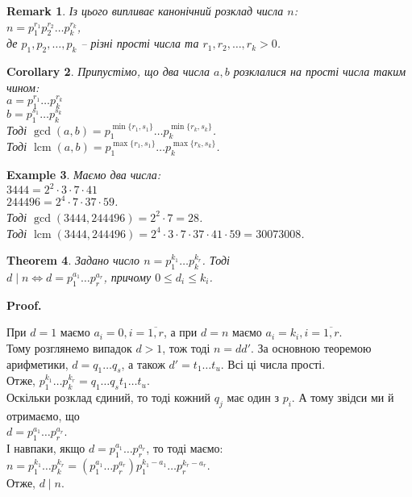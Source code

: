 \documentclass[a4paper, 14pt]{extarticle}
\makeatletter
\theoremstyle{theoremdd}
\newtheorem{theorem}{Theorem}[subsection]
\theoremstyle{theoremdd}
\theoremstyle{theoremdd}
\theoremstyle{theoremdd}
\newtheorem{example}[theorem]{Example}
\theoremstyle{theoremdd}
\theoremstyle{theoremdd}
\newtheorem{remark}[theorem]{Remark}
\theoremstyle{theoremdd}
\theoremstyle{theoremdd}
\newtheorem{corollary}[theorem]{Corollary}
\def\qed{$\blacksquare$}
\renewenvironment{proof}[1][Proof.\\]{\par
\pushQED{\hfill \qed}%
\normalfont \topsep6\p@\@plus6\p@\relax
\trivlist
\item\relax
{\bfseries
#1\@addpunct{.}}\hspace\labelsep\ignorespaces
}{%
\popQED\endtrivlist\@endpefalse
}
\DeclareMathOperator{\lcm}{lcm}
\makeatother
\begin{document}
\begin{remark}
Із цього випливає канонічний розклад числа $n$:\\
$n = p_1^{r_1} p_2^{r_2} \dots p_k^{r_k}$,\\
де $p_1, p_2, \dots, p_k$ -- різні прості числа та $r_1,r_2,\dots,r_k > 0$.
\end{remark}

\begin{corollary}
Припустімо, що два числа $a,b$ розклалися на прості числа таким чином:\\
$a = p_1^{r_1} \dots p_k^{r_k}$\\
$b = p_1^{s_1} \dots p_k^{s_k}$\\
Тоді $\gcd (a,b) = p_1^{\min \{r_1,s_1\}} \dots p_k^{\min \{r_k,s_k\}}$.\\
Тоді $\lcm(a,b) = p_1^{\max \{r_1,s_1\}} \dots p_k^{\max \{r_k,s_k\}}$.
\end{corollary}

\begin{example}
Маємо два числа:\\
$3444 = 2^2 \cdot 3 \cdot 7 \cdot 41$\\
$244496 = 2^4 \cdot 7 \cdot 37 \cdot 59$.\\
Тоді $\gcd(3444, 244496) = 2^2 \cdot 7 = 28$.\\
Тоді $\lcm(3444, 244496) = 2^4 \cdot 3 \cdot 7 \cdot 37 \cdot 41 \cdot 59 = 30073008$.
\end{example}

\begin{theorem}
Задано число $n = p_1^{k_1} \dots p_k^{k_r}$. Тоді\\
$d \mid n \iff d = p_1^{a_1} \dots p_r^{a_r}$, причому $0 \leq d_i \leq k_i$.
\end{theorem}

\begin{proof}
При $d = 1$ маємо $a_i = 0, i = \overline{1,r}$, а при $d = n$ маємо $a_i = k_i, i = \overline{1,r}$.\\
Тому розглянемо випадок $d > 1$, тож тоді $n = dd'$. За основною теоремою арифметики, $d = q_1\dots q_s$, а також $d' = t_1 \dots t_u$. Всі ці числа прості.\\
Отже, $p_1^{k_1} \dots p_k^{k_r} = q_1 \dots q_s t_1 \dots t_u$.\\
Оскільки розклад єдиний, то тоді кожний $q_j$ має один з $p_i$. А тому звідси ми й отримаємо, що\\
$d = p_1^{a_1} \dots p_r^{a_r}$.\\
І навпаки, якщо $d = p_1^{a_1} \dots p_r^{a_r}$, то тоді маємо: \\ $n = p_1^{k_1} \dots p_k^{k_r} = (p_1^{a_1} \dots p_r^{a_r}) p_1^{k_1 - a_1} \dots p_r^{k_r - a_r}$.\\
Отже, $d \mid n$.
\end{proof}
\end{document}
